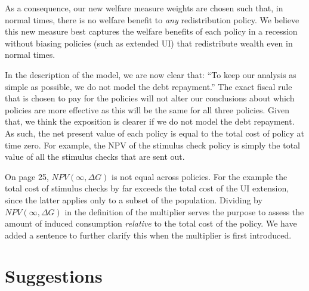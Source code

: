 \documentclass[12pt,letterpaper,english]{article}
\begin{document}
\begin{itemize}
	As a consequence, our new welfare measure weights are chosen such that, in normal times, there is no welfare benefit to \textit{any} redistribution policy. We believe this new measure best captures the welfare benefits of each policy in a recession without biasing policies (such as extended UI) that redistribute wealth even in normal times.
	
	In the description of the model, we are now clear that: ``To keep our analysis as simple as possible, we do not model the debt repayment.'' The exact fiscal rule that is chosen to pay for the policies will not alter our conclusions about which policies are more effective as this will be the same for all three policies. Given that, we think the exposition is clearer if we do not model the debt repayment. As such, the net present value of each policy is equal to the total cost of policy at time zero. For example, the NPV of the stimulus check policy is simply the total value of all the stimulus checks that are sent out. 
	
	On page 25, $NPV(\infty,\Delta G)$ is not equal across policies. For the example the total cost of stimulus checks by far exceeds the total cost of the UI extension, since the latter applies only to a subset of the population. Dividing by $NPV(\infty,\Delta G)$ in the definition of the multiplier serves the purpose to assess the amount of induced consumption \textit{relative} to the total cost of the policy. We have added a sentence to further clarify this when the multiplier is first introduced.

\end{itemize}

\section{Suggestions}
\end{document}
